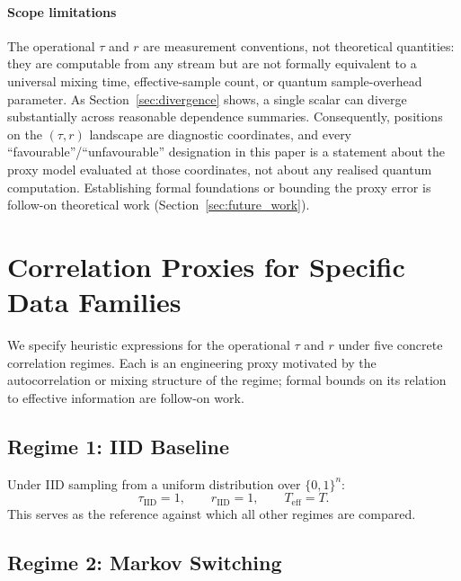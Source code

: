 \documentclass[sensors,article,submit,pdftex,moreauthors]{Definitions/mdpi}
\newcommand{\Teff}{T_{\mathrm{eff}}}
\providecommand{\DIFadd}[1]{{\protect\color{blue}#1}} %
\providecommand{\DIFdel}[1]{} %
\providecommand{\DIFaddbegin}{} %
\providecommand{\DIFaddend}{} %
\providecommand{\DIFdelbegin}{} %
\providecommand{\DIFdelend}{} %
\begin{document}
\paragraph{\DIFadd{Scope limitations}} \DIFadd{The operational $\tau$ and $r$ are measurement conventions, not theoretical quantities: they are computable from any stream but are not formally equivalent to a universal mixing time, effective-sample count, or quantum sample-overhead parameter. As Section~\ref{sec:divergence} shows, a single scalar can diverge substantially across reasonable dependence summaries. Consequently, positions on the $(\tau, r)$ landscape are diagnostic coordinates, and every ``favourable''/``unfavourable'' designation in this paper is a statement about the proxy model evaluated at those coordinates, not about any realised quantum computation. Establishing formal foundations or bounding the proxy error is follow-on theoretical work (Section~\ref{sec:future_work})}\DIFaddend .


\section{Correlation Proxies for Specific Data Families}
\label{sec:theory}

We specify heuristic expressions for the operational $\tau$ and $r$ under five concrete correlation regimes. Each is an engineering proxy motivated by the autocorrelation or mixing structure of the regime; \DIFdelbegin \DIFdel{tighter proofs of equivalence to the exact framework's correlation parameters }\DIFdelend \DIFaddbegin \DIFadd{formal bounds on its relation to effective information }\DIFaddend are follow-on work.

\subsection{Regime 1: IID Baseline}

Under IID sampling from a uniform distribution over $\{0,1\}^n$:
\begin{equation}
    \tau_{\text{IID}} = 1, \qquad r_{\text{IID}} = 1, \qquad \Teff = T.
\end{equation}
This serves as the reference against which all other regimes are compared.

\subsection{Regime 2: Markov Switching}
\end{document}
